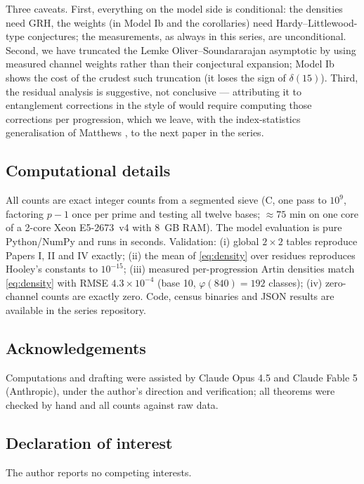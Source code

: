 \documentclass[11pt,reqno]{amsart}
\theoremstyle{plain}
\theoremstyle{definition}
\begin{document}
Three caveats. First, everything on the model side is conditional: the
densities need GRH, the weights (in Model Ib and the corollaries) need
Hardy--Littlewood-type conjectures; the measurements, as always in this
series, are unconditional. Second, we have truncated the
Lemke Oliver--Soundararajan asymptotic by using measured channel weights
rather than their conjectural expansion; Model Ib shows the cost of the
crudest such truncation (it loses the sign of $\delta(15)$). Third, the
residual analysis is suggestive, not conclusive --- attributing it to
entanglement corrections in the style of \cite{JarviniemiPeruccaSgobba2025}
would require computing those corrections per progression, which we leave,
with the index-statistics generalisation of Matthews \cite{Matthews1976},
to the next paper in the series.

\subsection*{Computational details}
All counts are exact integer counts from a segmented sieve
(C, one pass to $10^9$, factoring $p - 1$ once per prime and testing all
twelve bases; $\approx 75$ min on one core of a 2-core Xeon E5-2673~v4 with
8~GB RAM). The model evaluation is pure Python/NumPy and runs in seconds.
Validation: (i) global $2\times2$ tables reproduce Papers I, II and IV
exactly; (ii) the mean of \eqref{eq:density} over residues reproduces
Hooley's constants to $10^{-15}$; (iii) measured per-progression Artin
densities match \eqref{eq:density} with RMSE $4.3 \times 10^{-4}$ (base 10,
$\varphi(840) = 192$ classes); (iv) zero-channel counts are exactly zero.
Code, census binaries and JSON results are available in the series
repository.

\subsection*{Acknowledgements}
Computations and drafting were assisted by Claude Opus 4.5 and Claude
Fable 5 (Anthropic), under the author's direction and verification; all
theorems were checked by hand and all counts against raw data.

\subsection*{Declaration of interest}
The author reports no competing interests.
\end{document}
